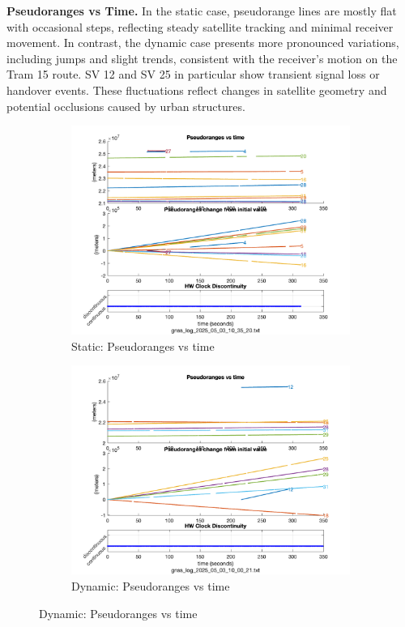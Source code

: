         \vspace{0.5em}
        \textbf{Pseudoranges vs Time.} 
        In the static case, pseudorange lines are mostly flat with occasional steps, reflecting steady satellite tracking and minimal receiver movement. In contrast, the dynamic case presents more pronounced variations, including jumps and slight trends, consistent with the receiver's motion on the Tram 15 route. SV 12 and SV 25 in particular show transient signal loss or handover events. These fluctuations reflect changes in satellite geometry and potential occlusions caused by urban structures.
        \begin{figure}[h!]
            \centering
            \begin{subfigure}{0.23\textwidth}
                \includegraphics[width=\textwidth]{images/Monte_Cappuccini/filtered/Samsung_A51_Monte_Cappuccini_fig1.png}
                \caption{Static: Pseudoranges vs time}
            \end{subfigure}
            \hfill
            \begin{subfigure}{0.23\textwidth}
                \includegraphics[width=\textwidth]{images/Tram_15_trip_Castello_to_Pescatore/filtered/Samsung_A51_Tram_15_trip_Castello_to_Pescatore_fig1.png}
                \caption{Dynamic: Pseudoranges vs time}
            \end{subfigure}
        \end{figure}
    

